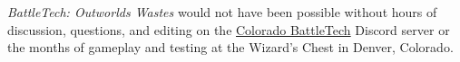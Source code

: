 \emph{BattleTech: Outworlds Wastes} would not have been possible without hours of discussion, questions, and editing on the \href{https://coloradobt.org}{Colorado BattleTech} Discord server or the months of gameplay and testing at the Wizard's Chest in Denver, Colorado.

